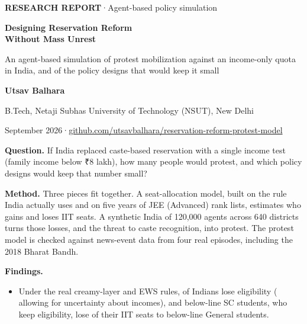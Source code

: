 \documentclass[11pt,a4paper]{article}
\newcommand{\rupee}{{\rupeefont ₹}}
\begin{document}
\begin{titlepage}
\setlength{\parindent}{0pt}
\vspace*{4mm}
{\sffamily\small\color{accent}\textbf{RESEARCH REPORT}\quad·\quad Agent-based policy simulation}\par\vspace{6mm}
{\sffamily\fontsize{24}{29}\selectfont\bfseries\color{ink} Designing Reservation Reform\\ Without Mass Unrest\par}
\vspace{4mm}
{\Large\color{muted} An agent-based simulation of protest mobilization against an income-only quota in India, and of the policy designs that would keep it small\par}
\vspace{9mm}
{\sffamily\large\textbf{Utsav Balhara}\par}
{\sffamily B.Tech, Netaji Subhas University of Technology (NSUT), New Delhi\par}
\vspace{3mm}
{\sffamily\small\color{muted}September 2026\quad·\quad \href{https://github.com/utsavbalhara/reservation-reform-protest-model}{github.com/utsavbalhara/reservation-reform-protest-model}\par}
\vspace{8mm}
\begin{keyresult}[At a glance]
\textbf{Question.} If India replaced caste-based reservation with a single income test (family income below \rupee8 lakh), how many people would protest, and which policy designs would keep that number small?\par\smallskip
\textbf{Method.} Three pieces fit together. A seat-allocation model, built on the rule India actually uses and on five years of JEE (Advanced) rank lists, estimates who gains and loses IIT seats. A synthetic India of 120{,}000 agents across 640 districts turns those losses, and the threat to caste recognition, into protest. The protest model is checked against news-event data from four real episodes, including the 2018 Bharat Bandh.\par\smallskip
\textbf{Findings.}
\begin{itemize}[leftmargin=12pt]
\item Under the real creamy-layer and EWS rules, \EligibilityLose{} of Indians lose eligibility (\EligibilityLoseJoint{} allowing for uncertainty about incomes), and below-line SC students, who keep eligibility, lose \AllocChangeSCBelow{} of their IIT seats to below-line General students.

\end{itemize}
\end{keyresult}
\end{titlepage}
\end{document}

